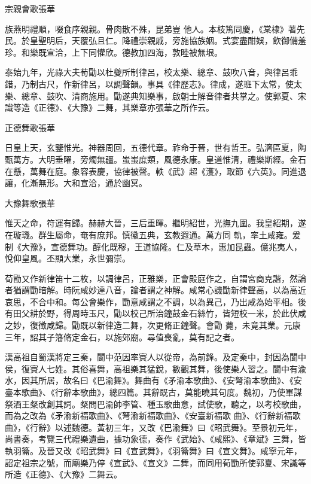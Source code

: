 \begin{pinyinscope}
 宗親會歌張華



 族燕明禮順，啜食序親親。骨肉散不殊，昆弟豈
 他人。本枝篤同慶，《棠棣》著先民。於皇聖明后，天覆弘且仁。降禮崇親戚，旁施協族姻。式宴盡酣娛，飲御備羞珍。和樂既宣洽，上下同懽欣。德教加四海，敦睦被無垠。



 泰始九年，光祿大夫荀勖以杜夔所制律呂，校太樂、總章、鼓吹八音，與律呂乖錯，乃制古尺，作新律呂，以調聲韻。事具《律歷志》。律成，遂班下太常，使太樂、總章、鼓吹、清商施用。勖遂典知樂事，啟朝士解音律者共掌之。使郭夏、宋識等造《正德》、《大豫》二舞，其樂章亦張華之所作云。



 正德舞歌張華



 日皇上天，玄鑒惟光。神器周回，五德代章。祚命于晉，世有哲王。弘濟區夏，陶甄萬方。大明垂曜，旁燭無疆。蚩蚩庶類，風德永康。皇道惟清，禮樂斯經。金石在懸，萬舞在庭。象容表慶，協律被聲。軼《武》超《濩》，取節《六英》。同進退讓，化漸無形。大和宣洽，通於幽冥。



 大豫舞歌張華



 惟天之命，符運有歸。赫赫大晉，三后重暉。繼明紹世，光撫九圍。我皇紹期，遂在璇璣。群生屬命，奄有庶邦。慎徽五典，玄教遐通。萬方同
 軌，率土咸雍。爰制《大豫》，宣德舞功。醇化既穆，王道協隆。仁及草木，惠加昆蟲。億兆夷人，悅仰皇風。丕顯大業，永世彌崇。



 荀勖又作新律笛十二枚，以調律呂，正雅樂，正會殿庭作之，自謂宮商克諧，然論者猶謂勖暗解。時阮咸妙達八音，論者謂之神解。咸常心譏勖新律聲高，以為高近哀思，不合中和。每公會樂作，勖意咸謂之不調，以為異己，乃出咸為始平相。後有田父耕於野，得周時玉尺，勖以校己所治鐘鼓金石絲竹，皆短校一米，於此伏咸之妙，復徵咸歸。勖既以新律造二舞，次更脩正鐘聲。會勖
 薨，未竟其業。元康三年，詔其子籓脩定金石，以施郊廟。尋值喪亂，莫有記之者。



 漢高祖自蜀漢將定三秦，閬中范因率賨人以從帝，為前鋒。及定秦中，封因為閬中侯，復賨人七姓。其俗喜舞，高祖樂其猛銳，數觀其舞，後使樂人習之。閬中有渝水，因其所居，故名曰《巴渝舞》。舞曲有《矛渝本歌曲》、《安弩渝本歌曲》、《安臺本歌曲》、《行辭本歌曲》，總四篇。其辭既古，莫能曉其句度。魏初，乃使軍謀祭酒王粲改創其詞。粲問巴渝帥李管、種玉歌曲意，試使歌，聽之，以考校歌曲，而為之改為《矛渝新福歌曲》、《弩渝新福歌曲》、《安臺新福歌
 曲》、《行辭新福歌曲》，《行辭》以述魏德。黃初三年，又改《巴渝舞》曰《昭武舞》。至景初元年，尚書奏，考覽三代禮樂遺曲，據功象德，奏作《武始》、《咸熙》、《章斌》三舞，皆執羽籥。及晉又改《昭武舞》曰《宣武舞》，《羽籥舞》曰《宣文舞》。咸寧元年，詔定祖宗之號，而廟樂乃停《宣武》、《宣文》二舞，而同用荀勖所使郭夏、宋識等所造《正德》、《大豫》二舞云。



\end{pinyinscope}